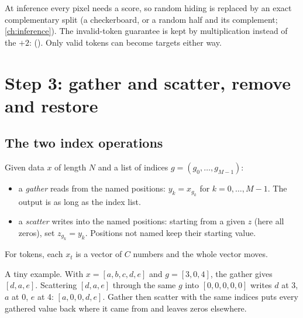 \begin{sourcenote}
At inference every pixel needs a score, so random hiding is replaced by an exact complementary split
(a checkerboard, or a random half and its complement; \cref{ch:inference}). The invalid-token guarantee
is kept by multiplication instead of the $+2$: 
(). Only valid tokens can become targets either way.
\end{sourcenote}

\section{Step 3: gather and scatter, remove and restore}\label{sec:masking:gather}

\subsection{The two index operations}

\begin{definition}
Given data $x$ of length $N$ and a list of indices $g = (g_0, \dots, g_{M-1})$:
\begin{itemize}
\item a \emph{gather} reads from the named positions: $y_k = x_{g_k}$ for $k = 0, \dots,
M-1$. The output is as long as the index list.
\item a \emph{scatter} writes into the named positions: starting from a given $z$
(here all zeros), set $z_{g_k} = y_k$. Positions not named keep their starting value.
\end{itemize}
For tokens, each $x_t$ is a vector of $C$ numbers and the whole vector moves.
\end{definition}

A tiny example. With $x = [a, b, c, d, e]$ and $g = [3, 0, 4]$, the gather gives $[d, a, e]$. Scattering
$[d, a, e]$ through the same $g$ into $[0,0,0,0,0]$ writes $d$ at 3, $a$ at 0, $e$ at 4: $[a, 0, 0, d, e]$.
Gather then scatter with the same indices puts every gathered value back where it came from and leaves
zeros elsewhere.


